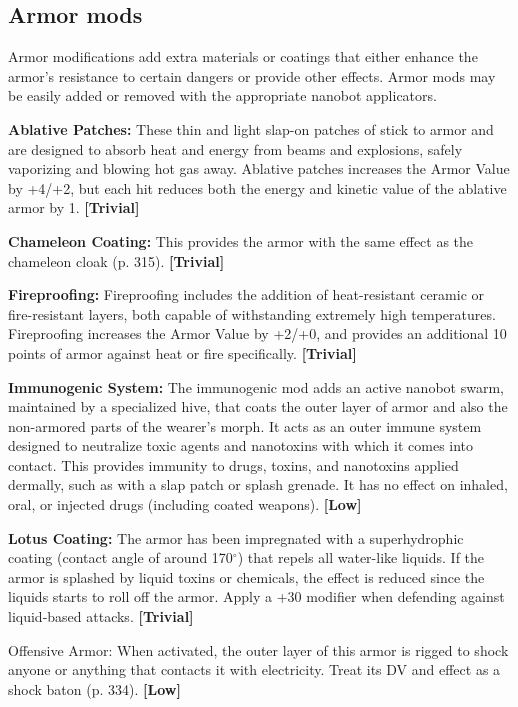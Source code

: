\subsection{Armor mods}
\label{sec:armor-mods}

Armor modifications add extra materials or coatings that either enhance the armor’s resistance to certain dangers or provide other effects. Armor mods may be easily added or removed with the appropriate nanobot applicators.

\textbf{Ablative Patches:} These thin and light slap-on patches of stick to armor and are designed to absorb heat and energy from beams and explosions, safely vaporizing and blowing hot gas away. Ablative patches increases the Armor Value by +4/+2, but each hit reduces both the energy and kinetic value of the ablative armor by 1. \textbf{[Trivial]}

\textbf{Chameleon Coating:} This provides the armor with the same effect as the chameleon cloak (p. 315). \textbf{[Trivial]}

\textbf{Fireproofing:} Fireproofing includes the addition of heat-resistant ceramic or fire-resistant layers, both capable of withstanding extremely high temperatures. Fireproofing increases the Armor Value by +2/+0, and provides an additional 10 points of armor against heat or fire specifically. \textbf{[Trivial]}

\textbf{Immunogenic System:} The immunogenic mod adds an active nanobot swarm, maintained by a specialized hive, that coats the outer layer of armor and also the non-armored parts of the wearer’s morph. It acts as an outer immune system designed to neutralize toxic agents and nanotoxins with which it comes into contact. This provides immunity to drugs, toxins, and nanotoxins applied dermally, such as with a slap patch or splash grenade. It has no effect on inhaled, oral, or injected drugs (including coated weapons). \textbf{[Low]}

\textbf{Lotus Coating:} The armor has been impregnated with a superhydrophic coating (contact angle of around 170$^{\circ}$) that repels all water-like liquids. If the armor is splashed by liquid toxins or chemicals, the effect is reduced since the liquids starts to roll off the armor. Apply a +30 modifier when defending against liquid-based attacks. \textbf{[Trivial]}

Offensive Armor: When activated, the outer layer of this armor is rigged to shock anyone or anything that contacts it with electricity. Treat its DV and effect as a shock baton (p. 334). \textbf{[Low]}

